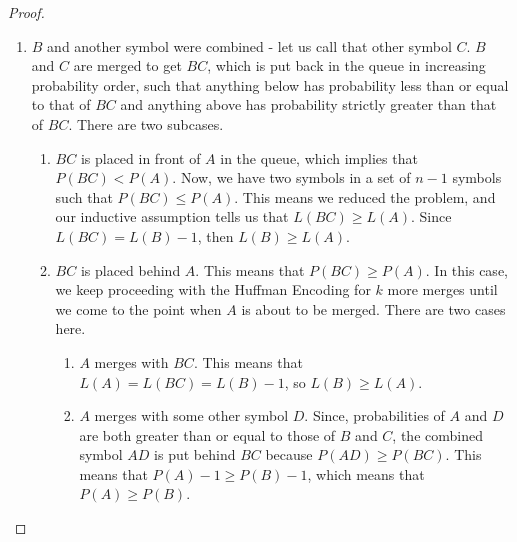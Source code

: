 \documentclass{article}
\begin{document}
\begin{proof}
\begin{enumerate}
			\item $B$ and another symbol were combined - let us call that other symbol $C$. $B$ and $C$ are merged to get $BC$, which is put back in the queue in increasing probability order, such that anything below has probability less than or equal to that of $BC$ and anything above has probability strictly greater than that of $BC$. There are two subcases.
			\begin{enumerate}
				\item $BC$ is placed in front of $A$ in the queue, which implies that $P(BC) < P(A)$. Now, we have two symbols in a set of $n-1$ symbols such that $P(BC) \leq P(A)$. This means we reduced the problem, and our inductive assumption tells us that $L(BC) \geq L(A)$. Since $L(BC) = L(B) - 1$, then $L(B) \geq L(A)$. 
				\item $BC$ is placed behind $A$. This means that $P(BC) \geq P(A)$. In this case, we keep proceeding with the Huffman Encoding for $k$ more merges until we come to the point when $A$ is about to be merged. There are two cases here.
					\begin{enumerate}
						\item $A$ merges with $BC$. This means that $L(A) = L(BC) = L(B) - 1$, so $L(B) \geq L(A)$.
						\item $A$ merges with some other symbol $D$. Since, probabilities of $A$ and $D$ are both greater than or equal to those of $B$ and $C$, the combined symbol $AD$ is put behind $BC$ because $P(AD) \geq P(BC)$. This means that
						$P(A) - 1 \geq P(B) - 1$, which means that $P(A) \geq P(B)$. \qedhere 
					\end{enumerate} 
			\end{enumerate}  
		\end{enumerate} 
	\end{proof}
\end{document}
